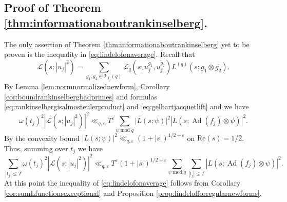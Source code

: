 \documentclass{article}
\theoremstyle{named}
\renewcommand{\L}{\mathcal{L}}
\newcommand{\T}{\mathcal{T}}
\DeclareMathOperator{\Ad}{Ad}
\DeclareMathOperator{\modulo}{mod}
\begin{document}
\subsection{Proof of Theorem \ref{thm:informationaboutrankinselberg}.}
The only assertion of Theorem \ref{thm:informationaboutrankinselberg} yet to be proven is the inequality in \eqref{eq:lindelofonaverage}. Recall that 
\begin{equation*}
    \L(s; |u_j|^2) = \sum_{g_1, g_2 \in \T_{f_j}(q)} \L_q(s; u_j^{g_1}, \overline{u_j^{g_2}})L^{(q)}(s; g_1 \otimes \overline{g_2}).
\end{equation*}
By Lemma \ref{lem:normnormalizednewform}, Corollary \ref{cor:boundrankinselbergbadprimes} and formulas \eqref{eq:rankinselbergisalmosteulerproduct} and \eqref{eq:gelbartjacquetlift} and we have 
\begin{equation*}
    \omega(t_j)^2 |\L(s; |u_j|^2)|^2 \ll_{q, \varepsilon} T^\varepsilon \sum_{\psi \modulo q} |L(s; \psi)|^2|L(s; \Ad(f_j)\otimes \psi)|^2.
\end{equation*}
By the convexity bound $|L(s; \psi)|^2 \ll_{q, \varepsilon} (1 + |s|)^{1/2 + \varepsilon}$ on $\text{Re}(s) = 1/2$. Thus, summing over $t_j$ we have 
\begin{equation*}
    \sum_{|t_j| \leq T} \omega(t_j)^2 |\L(s; |u_j|^2)|^2 \ll_{q, \varepsilon} T^\varepsilon (1 + |s|)^{1/2 + \varepsilon}  \sum_{\psi \modulo q}  \sum_{|t_j| \leq T}|L(s; \Ad(f_j)\otimes \psi)|^2.
\end{equation*}
At this point the inequality of \eqref{eq:lindelofonaverage} follows from Corollary \ref{cor:sumLfunctionsexceptional} and Proposition \ref{prop:lindelofforregularnewforms}. 
\end{document}
